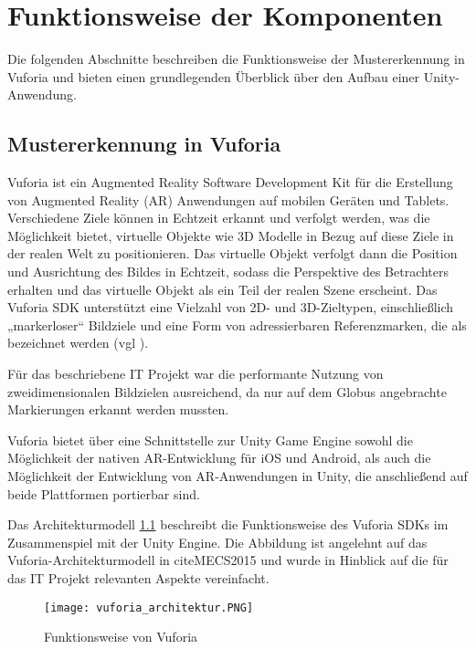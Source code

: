 \chapter{Funktionsweise der Komponenten}\label{ch:funktionsweise_der_komponenten}
Die folgenden Abschnitte beschreiben die Funktionsweise der Mustererkennung in Vuforia und bieten einen grundlegenden Überblick über den Aufbau einer Unity-Anwendung.
\section{Mustererkennung in Vuforia}
Vuforia ist ein Augmented Reality Software Development Kit für die Erstellung von Augmented Reality (AR) Anwendungen auf mobilen Geräten und Tablets.
Verschiedene Ziele können in Echtzeit erkannt und verfolgt werden, was die Möglichkeit bietet, virtuelle Objekte wie 3D Modelle in Bezug auf diese Ziele in der realen Welt zu positionieren.
Das virtuelle Objekt verfolgt dann die Position und Ausrichtung des Bildes in Echtzeit, sodass die Perspektive des Betrachters erhalten und das virtuelle Objekt als ein Teil der realen Szene erscheint.
Das Vuforia SDK unterstützt eine Vielzahl von 2D- und 3D-Zieltypen, einschließlich „markerloser“ Bildziele und eine Form von adressierbaren Referenzmarken, die als  bezeichnet werden (vgl \cite{Vuforia2018}). 

Für das beschriebene IT Projekt war die performante Nutzung von zweidimensionalen Bildzielen ausreichend, da nur auf dem Globus angebrachte Markierungen erkannt werden mussten.

Vuforia bietet über eine Schnittstelle zur Unity Game Engine sowohl die Möglichkeit der nativen AR-Entwicklung für iOS und Android, als auch die Möglichkeit der Entwicklung von AR-Anwendungen in Unity, die anschließend auf beide Plattformen portierbar sind.

Das Architekturmodell \ref{fig:vuforia_architektur} beschreibt die Funktionsweise des Vuforia SDKs im Zusammenspiel mit der Unity Engine. Die Abbildung ist angelehnt auf das Vuforia-Architekturmodell in cite{MECS2015} und wurde in Hinblick auf die für das IT Projekt relevanten Aspekte vereinfacht.

\begin{figure} [h]
\centering
\texttt{[image: vuforia\_architektur.PNG]}
\caption{Funktionsweise von Vuforia}
\label{fig:vuforia_architektur}
\end{figure}
 
